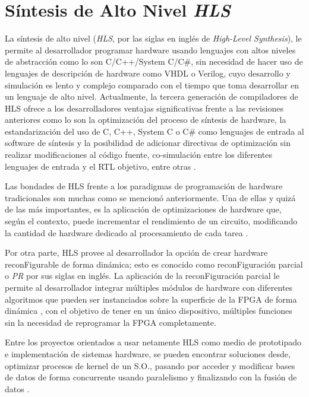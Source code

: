 \section{Síntesis de Alto Nivel \textit{HLS}}

La síntesis de alto nivel (\textit{HLS}, por las siglas en inglés de \textit{High-Level Synthesis}), le permite al desarrollador programar hardware usando lenguajes con altos niveles de abstracción como lo son C/C++/System C/C\#, sin necesidad de hacer uso de lenguajes de descripción de hardware como VHDL o Verilog, cuyo desarrollo y simulación es lento y complejo comparado con el tiempo que toma desarrollar en un lenguaje de alto nivel. Actualmente, la tercera generación de compiladores de HLS ofrece a los desarrolladores ventajas significativas frente a las revisiones anteriores como lo son la optimización del proceso de síntesis de hardware, la estandarización del uso de C, C++, System C o C\# como lenguajes de entrada al software de síntesis y la posibilidad de adicionar directivas de optimización sin realizar modificaciones al código fuente, co-simulación entre los diferentes lenguajes de entrada y el RTL objetivo, entre otras \cite{HLStory}.

Las bondades de HLS frente a los paradigmas de programación de hardware tradicionales son muchas como se mencionó anteriormente. Una de ellas y quizá de las más importantes, es la aplicación de optimizaciones de hardware que, según el contexto, puede incrementar el rendimiento de un circuito, modificando la cantidad de hardware dedicado al procesamiento de cada tarea \cite{HLSeffect,canis2013legup}. 

Por otra parte, HLS provee al desarrollador la opción de crear hardware reconFigurable de forma dinámica; esto es conocido como reconFiguración parcial o \textit{PR} por sus siglas en inglés. La aplicación de la reconFiguración parcial le permite al desarrollador integrar múltiples módulos de hardware con diferentes algoritmos que pueden ser instanciados sobre la superficie de la FPGA de forma dinámica \citep{kao2005benefits,wehner2014using,owens2013design}, con el objetivo de tener en un único dispositivo, múltiples funciones sin la necesidad de reprogramar la FPGA completamente.

Entre los proyectos orientados a usar netamente HLS como medio de prototipado e implementación de sistemas hardware, se pueden encontrar soluciones desde, optimizar procesos de kernel de un S.O., pasando por acceder y modificar bases de datos de forma concurrente usando paralelismo y finalizando con la fusión de datos  \citep{liu2013soft,monson2015using,navarro2013high,malazgirt2015high,choi2013software,alias2013optimizing,zhao2015area,liu2015moving}.


